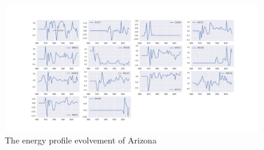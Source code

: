\documentclass[]{article}
\begin{document}
\begin{figure}[htb]
	\caption{The  energy profile evolvement of Arizona}
	\label{fig:Arizona energy profile}
	\includegraphics[scale=0.3]{az.png}
\end{figure}
\end{document}
